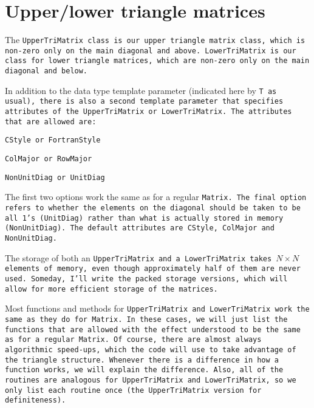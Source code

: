 
\section{Upper/lower triangle matrices}
\label{TriMatrix}

The \tt{UpperTriMatrix} class is our upper triangle matrix class, which is non-zero
only on the main diagonal and above.  \tt{LowerTriMatrix} is our class for lower
triangle matrices, which are non-zero only on the main diagonal and below.

In addition to the data type template parameter (indicated here by \tt{T} as usual),
there is also a second template parameter that specifies attributes of the
\tt{UpperTriMatrix} or \tt{LowerTriMatrix}.  The attributes that are allowed are:
\begin{description} \itemsep -2pt
\item[$\bullet$] \tt{CStyle} or \tt{FortranStyle}
\item[$\bullet$] \tt{ColMajor} or \tt{RowMajor}
\item[$\bullet$] \tt{NonUnitDiag} or \tt{UnitDiag}
\end{description}
The first two options work the same as for a regular \tt{Matrix}.
The final option refers to whether the elements on the diagonal should be 
taken to be all 1's (\tt{UnitDiag}) rather than what is actually stored 
in memory (\tt{NonUnitDiag}).
The default attributes are \tt{CStyle}, \tt{ColMajor} and \tt{NonUnitDiag}.

The storage of both an \tt{UpperTriMatrix} and a \tt{LowerTriMatrix} takes
$N \times N$ elements of memory, even though approximately half of them 
are never used.  Someday, I'll write the packed storage versions, which will
allow for more efficient storage of the matrices.

Most functions and methods for \tt{UpperTriMatrix} and \tt{LowerTriMatrix}
work the same as they do for \tt{Matrix}.
In these cases, we will just list the functions that are allowed with the
effect understood to be the same as for a regular \tt{Matrix}.  Of course, there are 
almost always algorithmic speed-ups, which the code will use to take advantage of the 
triangle structure.
Whenever there is a difference in how a function works,
we will explain the difference.
Also, all of the routines are analogous for \tt{UpperTriMatrix} and 
\tt{LowerTriMatrix}, so we only list each routine once 
(the \tt{UpperTriMatrix} version for definiteness).  


